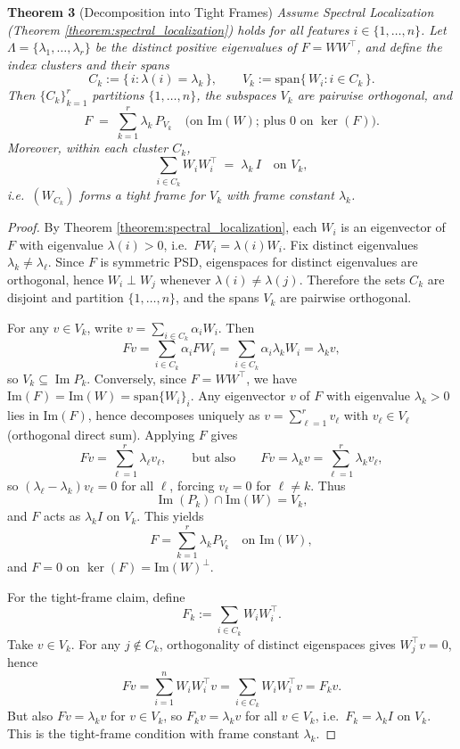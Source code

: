 \documentclass{article}
\theoremstyle{plain}
\numberwithin{equation}{section}
\theoremstyle{definition}
\theoremstyle{remark}
\begin{document}
\begin{lemmaproofbox}
\textbf{Theorem 3} (Decomposition into Tight Frames)\textit{ Assume Spectral Localization (Theorem \ref{theorem:spectral_localization}) holds for all features $i\in\{1,\dots,n\}$. Let
$\Lambda=\{\lambda_1,\dots,\lambda_r\}$ be the distinct positive eigenvalues of $F=WW^\top$,
and define the index clusters and their spans
\[
C_k := \{\,i : \lambda(i)=\lambda_k\,\},
\qquad
V_k := \mathrm{span}\{\,W_i : i\in C_k\,\}.
\]
Then $\{C_k\}_{k=1}^r$ partitions $\{1,\dots,n\}$, the subspaces $V_k$ are pairwise orthogonal, and
\[
F \;=\; \sum_{k=1}^r \lambda_k\,P_{V_k}
\quad \text{(on $\mathrm{Im}(W)$; plus $0$ on $\ker(F)$).}
\]
Moreover, within each cluster $C_k$,
\[
\sum_{i\in C_k} W_i W_i^\top \;=\; \lambda_k\,I
\quad \text{on }V_k,
\]
i.e.\ $(W_{C_k})$ forms a tight frame for $V_k$ with frame constant $\lambda_k$.}
\begin{proof}\label{theorem:decomp_tight_frame}
By Theorem \ref{theorem:spectral_localization}, each $W_i$ is an eigenvector of $F$ with eigenvalue $\lambda(i)>0$, i.e.\ $F W_i=\lambda(i)W_i$.
Fix distinct eigenvalues $\lambda_k\neq\lambda_\ell$. Since $F$ is symmetric PSD, eigenspaces for distinct eigenvalues are orthogonal, hence
$W_i\perp W_j$ whenever $\lambda(i)\neq\lambda(j)$. Therefore the sets $C_k$ are disjoint and partition $\{1,\dots,n\}$, and the spans $V_k$ are pairwise orthogonal.

For any $v\in V_k$, write $v=\sum_{i\in C_k}\alpha_i W_i$. Then
\[
Fv=\sum_{i\in C_k}\alpha_i F W_i
=\sum_{i\in C_k}\alpha_i \lambda_k W_i
=\lambda_k v,
\]
so $V_k\subseteq \operatorname{Im}{P_k}$. Conversely, since $F=WW^\top$, we have $\mathrm{Im}(F)=\mathrm{Im}(W)=\mathrm{span}\{W_i\}_i$. Any eigenvector $v$ of $F$ with eigenvalue $\lambda_k>0$ lies in $\mathrm{Im}(F)$, hence decomposes uniquely as
$v=\sum_{\ell=1}^r v_\ell$ with $v_\ell\in V_\ell$ (orthogonal direct sum). Applying $F$ gives
\[
Fv=\sum_{\ell=1}^r \lambda_\ell v_\ell,
\qquad\text{but also}\qquad
Fv=\lambda_k v=\sum_{\ell=1}^r \lambda_k v_\ell,
\]
so $(\lambda_\ell-\lambda_k)v_\ell=0$ for all $\ell$, forcing $v_\ell=0$ for $\ell\neq k$. Thus
\[
\operatorname{Im}({P_k})\cap \mathrm{Im}(W)=V_k,
\]
and $F$ acts as $\lambda_k I$ on $V_k$. This yields
\[
F=\sum_{k=1}^r \lambda_k P_{V_k}\quad\text{on }\mathrm{Im}(W),
\]
and $F=0$ on $\ker(F)=\mathrm{Im}(W)^\perp$.

For the tight-frame claim, define
\[
F_k := \sum_{i\in C_k} W_i W_i^\top.
\]
Take $v\in V_k$. For any $j\notin C_k$, orthogonality of distinct eigenspaces gives $W_j^\top v=0$, hence
\[
Fv=\sum_{i=1}^n W_i W_i^\top v=\sum_{i\in C_k} W_i W_i^\top v=F_k v.
\]
But also $Fv=\lambda_k v$ for $v\in V_k$, so $F_k v=\lambda_k v$ for all $v\in V_k$, i.e.\ $F_k=\lambda_k I$ on $V_k$.
This is the tight-frame condition with frame constant $\lambda_k$.
\end{proof}
\end{lemmaproofbox}
\end{document}

